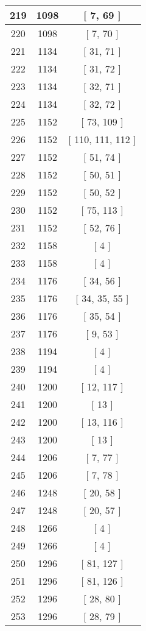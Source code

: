 \begin{center}
\begin{longtable}[H]{|| c c c ||}
\hline
219 & 1098 & [ 7, 69 ] \\ 
\hline
220 & 1098 & [ 7, 70 ] \\ 
\hline
221 & 1134 & [ 31, 71 ] \\ 
\hline
222 & 1134 & [ 31, 72 ] \\ 
\hline
223 & 1134 & [ 32, 71 ] \\ 
\hline
224 & 1134 & [ 32, 72 ] \\ 
\hline
225 & 1152 & [ 73, 109 ] \\ 
\hline
226 & 1152 & [ 110, 111, 112 ] \\ 
\hline
227 & 1152 & [ 51, 74 ] \\ 
\hline
228 & 1152 & [ 50, 51 ] \\ 
\hline
229 & 1152 & [ 50, 52 ] \\ 
\hline
230 & 1152 & [ 75, 113 ] \\ 
\hline
231 & 1152 & [ 52, 76 ] \\ 
\hline
232 & 1158 & [ 4 ] \\ 
\hline
233 & 1158 & [ 4 ] \\ 
\hline
234 & 1176 & [ 34, 56 ] \\ 
\hline
235 & 1176 & [ 34, 35, 55 ] \\ 
\hline
236 & 1176 & [ 35, 54 ] \\ 
\hline
237 & 1176 & [ 9, 53 ] \\ 
\hline
238 & 1194 & [ 4 ] \\ 
\hline
239 & 1194 & [ 4 ] \\ 
\hline
240 & 1200 & [ 12, 117 ] \\ 
\hline
241 & 1200 & [ 13 ] \\ 
\hline
242 & 1200 & [ 13, 116 ] \\ 
\hline
243 & 1200 & [ 13 ] \\ 
\hline
244 & 1206 & [ 7, 77 ] \\ 
\hline
245 & 1206 & [ 7, 78 ] \\ 
\hline
246 & 1248 & [ 20, 58 ] \\ 
\hline
247 & 1248 & [ 20, 57 ] \\ 
\hline
248 & 1266 & [ 4 ] \\ 
\hline
249 & 1266 & [ 4 ] \\ 
\hline
250 & 1296 & [ 81, 127 ] \\ 
\hline
251 & 1296 & [ 81, 126 ] \\ 
\hline
252 & 1296 & [ 28, 80 ] \\ 
\hline
253 & 1296 & [ 28, 79 ] \\ 
\hline

\end{longtable}
\end{center}
